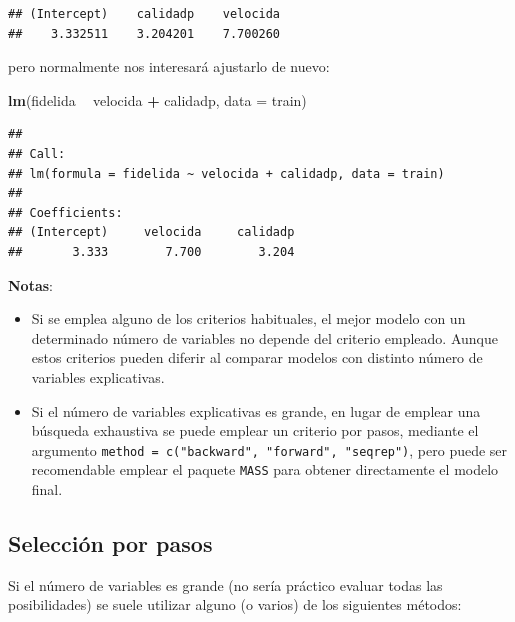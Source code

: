 \documentclass[
]{book}
\newenvironment{Shaded}{\begin{snugshade}}{\end{snugshade}}
\newcommand{\DataTypeTok}[1]{\textcolor[rgb]{0.13,0.29,0.53}{#1}}
\newcommand{\KeywordTok}[1]{\textcolor[rgb]{0.13,0.29,0.53}{\textbf{#1}}}
\newcommand{\NormalTok}[1]{#1}
\newcommand{\OperatorTok}[1]{\textcolor[rgb]{0.81,0.36,0.00}{\textbf{#1}}}
\newcommand{\StringTok}[1]{\textcolor[rgb]{0.31,0.60,0.02}{#1}}
\theoremstyle{break}
\theoremstyle{definition}
\theoremstyle{definition}
\theoremstyle{definition}
\theoremstyle{remark}
\begin{document}
\begin{verbatim}
## (Intercept)    calidadp    velocida 
##    3.332511    3.204201    7.700260
\end{verbatim}

pero normalmente nos interesará ajustarlo de nuevo:

\begin{Shaded}
\begin{Highlighting}[]
\KeywordTok{lm}\NormalTok{(fidelida }\OperatorTok{~}\StringTok{ }\NormalTok{velocida }\OperatorTok{+}\StringTok{ }\NormalTok{calidadp, }\DataTypeTok{data =}\NormalTok{ train)}
\end{Highlighting}
\end{Shaded}

\begin{verbatim}
## 
## Call:
## lm(formula = fidelida ~ velocida + calidadp, data = train)
## 
## Coefficients:
## (Intercept)     velocida     calidadp  
##       3.333        7.700        3.204
\end{verbatim}

\textbf{Notas}:

\begin{itemize}
\item
  Si se emplea alguno de los criterios habituales, el mejor modelo con un determinado
  número de variables no depende del criterio empleado.
  Aunque estos criterios pueden diferir al comparar modelos con distinto número de
  variables explicativas.
\item
  Si el número de variables explicativas es grande, en lugar de emplear una
  búsqueda exhaustiva se puede emplear un criterio por pasos, mediante el argumento
  \texttt{method\ =\ c("backward",\ "forward",\ "seqrep")}, pero puede ser recomendable
  emplear el paquete \texttt{MASS} para obtener directamente el modelo final.
\end{itemize}

\hypertarget{selecciuxf3n-por-pasos}{%
\subsection{Selección por pasos}\label{selecciuxf3n-por-pasos}}

Si el número de variables es grande (no sería práctico evaluar todas las posibilidades)
se suele utilizar alguno (o varios) de los siguientes métodos:
\end{document}

